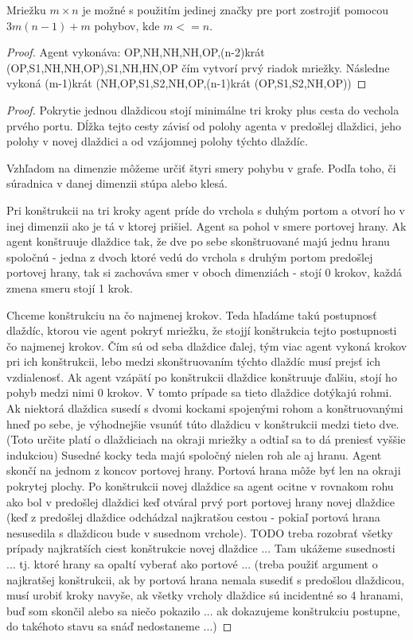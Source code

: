 \begin{veta}
Mriežku $m \times n$ je možné s použitím jedinej značky pre port zostrojiť
pomocou $3m(n - 1) + m$ pohybov, kde $m <= n$.
\end{veta}
\begin{proof}
Agent vykonáva: OP,NH,NH,NH,OP,(n-2)krát (OP,S1,NH,NH,OP),S1,NH,HN,OP čím
vytvorí prvý riadok mriežky. Následne vykoná
(m-1)krát (NH,OP,S1,S2,NH,OP,(n-1)krát (OP,S1,S2,NH,OP))
\end{proof}

\begin{proof}
Pokrytie jednou dlaždicou stojí minimálne tri kroky plus cesta do vechola
prvého portu. Dĺžka tejto cesty závisí od polohy agenta v predošlej
dlaždici, jeho polohy v novej dlaždici a od vzájomnej polohy týchto dlaždíc. 

Vzhľadom na dimenzie môžeme určiť štyri smery pohybu v grafe. Podľa toho, či
súradnica v danej dimenzii stúpa alebo klesá.

Pri konštrukcii na tri kroky agent príde do vrchola s duhým portom a otvorí
ho v inej dimenzii ako je tá v ktorej prišiel. Agent sa pohol v smere
portovej hrany.
Ak agent konštruuje dlaždice tak, že dve po sebe skonštruované majú jednu 
hranu spoločnú - jedna z dvoch ktoré vedú do vrchola s druhým portom
predošlej portovej hrany, tak si zachováva smer v oboch dimenziách - stojí 0
krokov, každá zmena smeru stojí 1 krok.

Chceme konštrukciu na čo najmenej krokov. Teda hľadáme takú postupnosť
dlaždíc, ktorou vie agent pokryť mriežku, že stojjí konštrukcia tejto
postupnosti čo najmenej krokov.
Čím sú od seba dlaždice ďalej, tým viac agent vykoná krokov pri ich
konštrukcii, lebo medzi skonštruovaním týchto dlaždíc musí prejsť ich
vzdialenosť.
Ak agent vzápätí po konštrukcii dlaždice konštruuje ďalšiu, stojí ho pohyb
medzi nimi 0 krokov. V tomto prípade sa tieto dlaždice dotýkajú rohmi.
Ak niektorá dlaždica susedí s dvomi kockami spojenými rohom a konštruovanými
hneď po sebe, je výhodnejšie vsunúť túto dlaždicu v konštrukcii medzi tieto
dve. (Toto určite platí o dlaždiciach na okraji mriežky a odtiaľ sa to dá
preniesť vyššie indukciou)
Susedné kocky teda majú spoločný nielen roh ale aj hranu. Agent skončí na
jednom z koncov portovej hrany. Portová hrana môže byť len na okraji
pokrytej plochy.
Po konštrukcii novej dlaždice sa agent ocitne v rovnakom rohu ako bol v
predošlej dlaždici keď otváral prvý port portovej hrany novej dlaždice (keď
z predošlej dlaždice odchádzal najkratšou cestou - pokiaľ portová hrana
nesusedila s dlaždicou bude v susednom vrchole).
TODO treba rozobrať všetky prípady najkratších ciest konštrukcie novej
dlaždice ...
Tam ukážeme susednosti ... tj. ktoré hrany sa opaltí vyberať ako portové ...
(treba použiť argument o najkratšej konštrukcii, ak by portová hrana nemala
susediť s predošlou dlaždicou, musí urobiť kroky navyše, ak všetky vrcholy
dlaždice sú incidentné so 4 hranami, buď som skončil alebo sa niečo pokazilo
... ak dokazujeme konštrukciu postupne, do takéhoto stavu sa snáď
nedostaneme ...) 


\end{proof}
